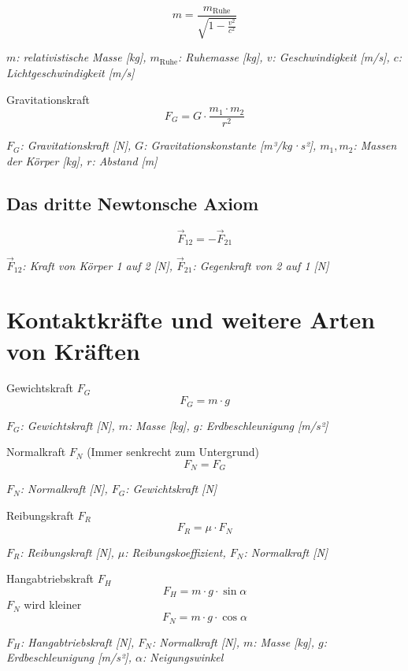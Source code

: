 \documentclass[a5paper,10pt]{article}
\newenvironment{displayformula}
{
	\begin{framed}
		\color{formulaColor}
	}
	{\end{framed}}
\newcommand{\formulalegend}[1]{%
	\par\vspace{0.5ex}%
	{{\color{legendColor}\RaggedRight\small\textit{#1}}}%
	\par\vspace{1.5ex}%
}
\begin{document}
\begin{displayformula}
	\[
	m = \frac{m_{\text{Ruhe}}}{\sqrt{1 - \frac{v^2}{c^2}}}
	\]
\end{displayformula}
\formulalegend{
	\( m \): relativistische Masse [kg], \( m_{\text{Ruhe}} \): Ruhemasse [kg], \( v \): Geschwindigkeit [m/s], \( c \): Lichtgeschwindigkeit [m/s]
}

\begin{displayformula}
	Gravitationskraft
	\[
	F_G = G \cdot \frac{m_1 \cdot m_2}{r^2}
	\]
\end{displayformula}
\formulalegend{
	\( F_G \): Gravitationskraft [N], \( G \): Gravitationskonstante [m³/kg·s²], \( m_1, m_2 \): Massen der Körper [kg], \( r \): Abstand [m]
}

\subsection{Das dritte Newtonsche Axiom}

\begin{displayformula}
	\[
	\vec{F}_{12} = -\vec{F}_{21}
	\]
\end{displayformula}
\formulalegend{
	\( \vec{F}_{12} \): Kraft von Körper 1 auf 2 [N], \( \vec{F}_{21} \): Gegenkraft von 2 auf 1 [N]
}
\newpage


\section{Kontaktkräfte und weitere Arten von Kräften}

\begin{displayformula}
	Gewichtskraft \( F_G \)
	\[
	F_G = m \cdot g
	\]
\end{displayformula}
\formulalegend{
	\( F_G \): Gewichtskraft [N], \( m \): Masse [kg], \( g \): Erdbeschleunigung [m/s²]
}

\begin{displayformula}
	Normalkraft \( F_N \) (Immer senkrecht zum Untergrund)
	\[
	F_N = F_G
	\]
\end{displayformula}
\formulalegend{
	\( F_N \): Normalkraft [N], \( F_G \): Gewichtskraft [N]
}

\begin{displayformula}
	Reibungskraft \( F_R \)
	\[
	F_R = \mu \cdot F_N
	\]
\end{displayformula}
\formulalegend{
	\( F_R \): Reibungskraft [N], \( \mu \): Reibungskoeffizient, \( F_N \): Normalkraft [N]
}

\begin{displayformula}
	Hangabtriebskraft \( F_H \)
	\[
	F_H = m \cdot g \cdot \sin\alpha
	\]
	\( F_N \) wird kleiner
	\[
	F_N = m \cdot g \cdot \cos\alpha
	\]
\end{displayformula}
\formulalegend{
	\( F_H \): Hangabtriebskraft [N], \( F_N \): Normalkraft [N], \( m \): Masse [kg], \( g \): Erdbeschleunigung [m/s²], \( \alpha \): Neigungswinkel
}
\end{document}
